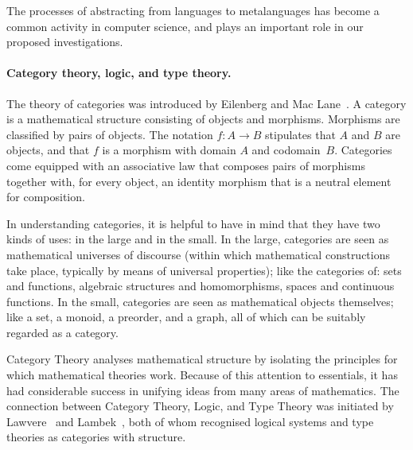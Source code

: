 \documentclass[11pt,twocolumn]{article}
\begin{document}
The processes of abstracting from languages to metalanguages has become a
common activity in computer science, and plays an important role in our
proposed investigations.  

\paragraph{Category theory, logic, and type theory.}

The theory of categories was introduced by Eilenberg and Mac
Lane~\cite{EilenbergMacLane}.  A category is a mathematical structure
consisting of objects and morphisms.  Morphisms are classified
by pairs of objects. The notation $f:A\to B$ stipulates that $A$ and $B$ are objects, and
that $f$ is a morphism with domain $A$ and codomain~$B$.  
Categories come equipped with an associative law that composes pairs of
morphisms 
together with, for every object, an identity morphism 
that is a neutral element for composition.  

In understanding categories, it is helpful to have in mind
that they have two kinds of uses: in the
large and in the small.  In the large, categories are seen as mathematical
universes of discourse (within which mathematical constructions take place,
typically by means of universal properties); like the categories of: sets and
functions, algebraic structures and homomorphisms, spaces and continuous
functions.  In the small, categories are seen as mathematical objects
themselves; like a set, a monoid, a preorder, and a graph, all of which can
be suitably regarded as a category.

Category Theory analyses mathematical structure by isolating the principles
for which mathematical theories work.  Because of this attention to
essentials, it has had considerable success in unifying ideas from many areas
of mathematics. 
%
The connection between Category Theory, Logic, and Type Theory was
initiated by Lawvere~\cite{LawvereAinF} and Lambek~\cite{LambekI}, both
of whom recognised logical systems and type theories as categories with
structure.  
\end{document}
